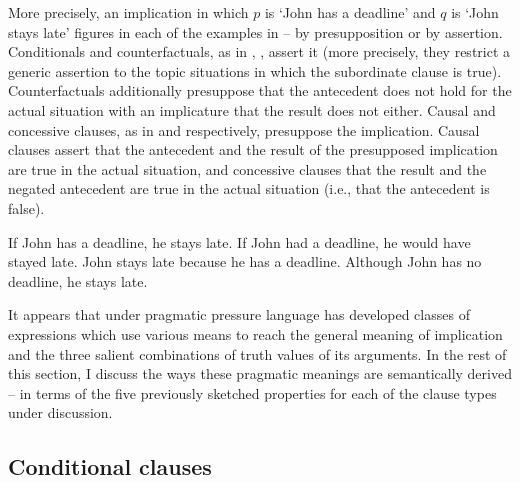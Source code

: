 \documentclass[output=paper]{langscibook}
\begin{document}
More precisely, an implication in which $p$ is `John has a deadline' and $q$ is `John stays late' figures in each of the examples in  -- by presupposition or by assertion. Conditionals and counterfactuals, as in , , assert it (more precisely, they restrict a generic assertion to the topic situations in which the subordinate clause is true). Counterfactuals additionally presuppose that the antecedent does not hold for the actual situation with an implicature that the result does not either. Causal and concessive clauses, as in  and  respectively, presuppose the implication. Causal clauses assert that the antecedent and the result of the presupposed implication are true in the actual situation, and concessive clauses that the result and the negated antecedent are true in the actual situation (i.e., that the antecedent is false).

\ea\label{ex:Logic}
\ea If John has a deadline, he stays late.\label{ex:Logic-a}
\ex If John had a deadline, he would have stayed late.\label{ex:Logic-b}
\ex John stays late because he has a deadline.\label{ex:Logic-c}
\ex Although John has no deadline, he stays late.\label{ex:Logic-d}
\z\z

\noindent It appears that under pragmatic pressure language has developed classes of expressions which use various means to reach the general meaning of implication and the three salient combinations of truth values of its arguments. In the rest of this section, I discuss the ways these pragmatic meanings are semantically derived -- in terms of the five previously sketched properties for each of the clause types under discussion.

\subsection{Conditional clauses}
\end{document}

